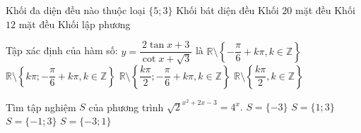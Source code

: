 \begin{ex}%
Khối đa diện đều nào thuộc loại $\{5; 3\}$
\choice
{ Khối bát diện đều}
{ Khối $20$ mặt đều}
{\True Khối $12$ mặt đều}
{ Khối lập phương}
\end{ex}
\begin{ex}%
Tập xác định của hàm số: $y=\dfrac{2\tan x+3}{\cot x+\sqrt{3}}$ là
\choice
{ $\mathbb{R}\setminus \left \{ -\dfrac{\pi }{6}+k\pi ,k\in \mathbb{Z}\right \}$ }
{ $\mathbb{R}\setminus \left\{ k\pi ;-\dfrac{\pi }{6}+k\pi ,k\in \mathbb{Z} \right\}$ }
{\True $\mathbb{R}\setminus \left\{ \dfrac{k\pi }{2};-\dfrac{\pi }{6}+k\pi ,k\in \mathbb{Z} \right\}$}
{ $\mathbb{R}\setminus \left\{ \dfrac{k\pi }{2},k\in \mathbb{Z} \right\}$}
\end{ex}
\begin{ex}%
Tìm tập nghiệm $S$ của phương trình $\sqrt{2}^{x^2+2x-3}=4^x.$
\choice
{ $S=\{-3\}$}
{ $S=\{1;3\}$}
{\True $S=\{-1;3\}$}
{ $S=\{-3;1\}$}
\end{ex}
